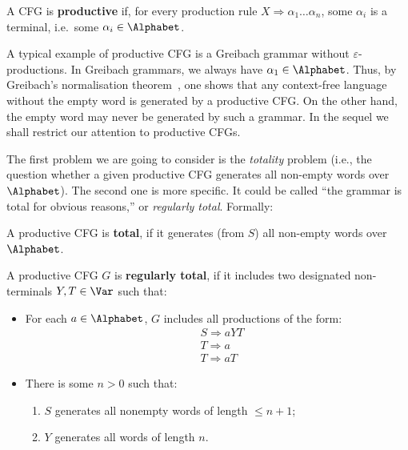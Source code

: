 \begin{definition}
A CFG is \textbf{productive} if, for every production rule $X \Rightarrow \alpha_1 \ldots \alpha_n$, some $\alpha_i$ is a terminal, i.e.\ some $\alpha_i \in \Alphabet$.
\end{definition}

A typical example of productive CFG is a Greibach grammar without $\varepsilon$-pro\-duc\-ti\-ons. In Greibach grammars, we always have $\alpha_1 \in \Alphabet$. Thus, by Greibach's normalisation theorem~\cite{Greibach1965}, one shows that any context-free language without the empty word is generated by a productive CFG. On the other hand, the empty word may never be generated by such a grammar.
In the sequel we shall restrict our attention to productive CFGs.

The first problem we are going to consider is the {\em totality} problem (i.e., the question whether a given productive CFG generates all non-empty words over $\Alphabet$). The second one is more specific. It could be called ``the grammar is total for obvious reasons,'' or {\em regularly total}. 
Formally:


\begin{definition}
\label{def-regtotal}
A productive CFG is \textbf{total}, if it generates (from $S$) all non-empty words over $\Alphabet$.


A productive CFG $G$ is \textbf{regularly total}, if it includes two designated non-terminals $Y,T \in \Var$ such that:
\begin{itemize}
    \item For each $a \in \Alphabet$, $G$ includes all productions of the form:
    \begin{align*}
& S \Rightarrow a Y T \\
& T \Rightarrow a \\
& T \Rightarrow a T 
\end{align*}
\item There is some $n>0$ such that:
\begin{enumerate}
    \item $S$ generates all nonempty words of length $\leq n+1$;
    \item $Y$ generates all words of length $n$.
\end{enumerate}
\end{itemize}

\end{definition}

